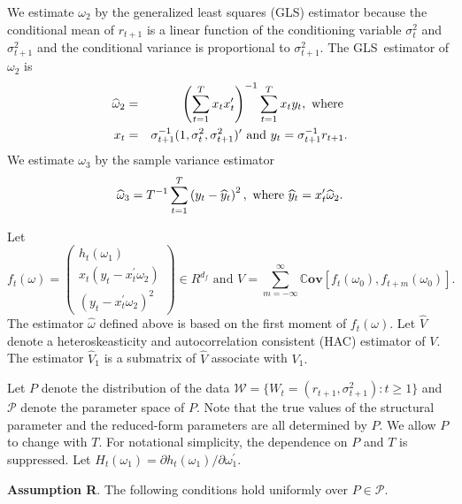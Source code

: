 \documentclass[11pt]{article}
\begin{document}
We estimate $\omega _{2}$ by the generalized least squares (GLS) estimator
because the conditional mean of $r_{t+1}$ is a linear function of the
conditioning variable $\sigma _{t}^{2}$ and $\sigma _{t+1}^{2}$ and the
conditional variance is proportional to $\sigma _{t+1}^{2}.$ The GLS\
estimator of $\omega _{2}$ is%
\begin{eqnarray}
\widehat{\omega }_{2} &=&\left( \sum_{t=1}^{T}x_{t}x_{t}^{\prime }\right)
^{-1}\sum_{t=1}^{T}x_{t}y_{t},\text{ where }  \notag \\
x_{t} &=&\sigma _{t+1}^{-1}(1,\sigma _{t}^{2},\sigma _{t+1}^{2})^{\prime }%
\text{ and }y_{t}=\sigma _{t+1}^{-1}r_{t+1}.  \label{omega 2 est}
\end{eqnarray}%
We estimate $\omega _{3}$ by the sample variance estimator%
\begin{equation}
\widehat{\omega }_{3}=T^{-1}\sum_{t=1}^{T}\left( y_{t}-\widehat{y}%
_{t}\right) ^{2},\text{ where }\widehat{y}_{t}=x_{t}^{\prime }\widehat{%
\omega }_{2}.  \label{omega 3 est}
\end{equation}

Let 
\begin{equation}
f_{t}(\omega )=\left( 
\begin{array}{c}
h_{t}(\omega _{1}) \\ 
x_{t}(y_{t}-x_{t}^{\prime }\omega _{2}) \\ 
(y_{t}-x_{t}^{\prime }\omega _{2})^{2}%
\end{array}%
\right) \in R^{d_{f}}\text{ and }V=\sum_{m=-\infty }^{\infty }\mathbb{C}%
\mathbf{ov}[f_{t}(\omega _{0}),f_{t+m}(\omega _{0})].
\end{equation}%
The estimator $\widehat{\omega }$ defined above is based on the first moment
of $f_{t}(\omega ).$ Let $\widehat{V}$ denote a heteroskeasticity and
autocorrelation consistent (HAC) estimator of $V$. The estimator $\widehat{V}%
_{1}$ is a submatrix of $\widehat{V}$ associate with $V_{1}.$

Let $P$ denote the distribution of the data $\mathcal{W}=\{W_{t}=(r_{t+1},%
\sigma _{t+1}^{2}):t\geq 1\}$ and $\mathcal{P}$ denote the parameter space
of $P$. Note that the true values of the structural parameter and the
reduced-form parameters are all determined by $P.$ We allow $P$ to change
with $T.$ For notational simplicity, the dependence on $P$ and $T$ is
suppressed. Let $H_{t}(\omega _{1})=\partial h_{t}(\omega _{1})/\partial
\omega _{1}^{\prime }.$ 

\smallskip 

\noindent \textbf{Assumption R}. The following conditions hold uniformly
over $P\in \mathcal{P}$.
\end{document}
